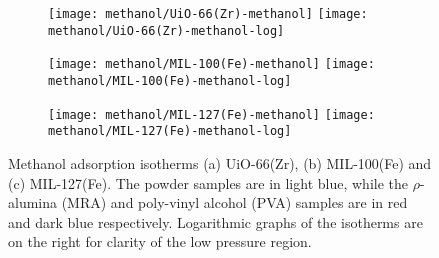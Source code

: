 \begin{figure}[p!]
    \centering

    \begin{subfigure}{\linewidth}
        \centering
        \parbox{0.1\linewidth}{\caption{}\label{shaping:fgr:methanoluio66}}%
        \texttt{[image: methanol/UiO-66(Zr)-methanol]}%
        \texttt{[image: methanol/UiO-66(Zr)-methanol-log]}%
    \end{subfigure}

    \begin{subfigure}{\linewidth}
        \centering
        \parbox{0.1\linewidth}{\caption{}\label{shaping:fgr:methanolmil100}}%
        \texttt{[image: methanol/MIL-100(Fe)-methanol]}%
        \texttt{[image: methanol/MIL-100(Fe)-methanol-log]}%
    \end{subfigure}

    \begin{subfigure}{\linewidth}
        \centering
        \parbox{0.1\linewidth}{\caption{}\label{shaping:fgr:methanolmil127}}%
        \texttt{[image: methanol/MIL-127(Fe)-methanol]}%
        \texttt{[image: methanol/MIL-127(Fe)-methanol-log]}%
    \end{subfigure}
    
    \caption{Methanol adsorption isotherms (a) UiO-66(Zr), 
    (b) MIL-100(Fe) and (c) MIL-127(Fe). The powder samples are in light
    blue, while the \(\rho\)-alumina (MRA) and poly-vinyl alcohol 
    (PVA) samples are in red and dark blue respectively. Logarithmic 
    graphs of the isotherms are on the right for clarity of the low
    pressure region.}%
    \label{shaping:fgr:methanoladsorption}
\end{figure}